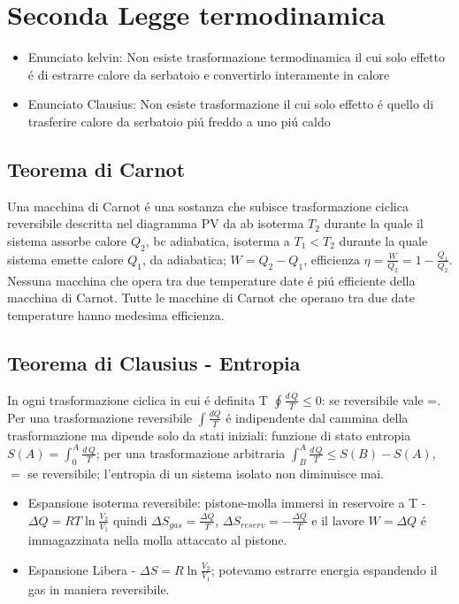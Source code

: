     \chapter{Seconda Legge termodinamica}
        \begin{itemize}
        \item Enunciato kelvin: Non esiste trasformazione termodinamica il cui solo effetto \'e di estrarre calore da serbatoio e convertirlo interamente in calore
        \item Enunciato Clausius: Non esiste trasformazione il cui solo effetto \'e quello di trasferire calore da serbatoio pi\'u freddo a uno pi\'u caldo
        \end{itemize}
        \section{Teorema di Carnot}
        Una macchina di Carnot \'e una sostanza che subisce trasformazione ciclica reversibile descritta nel diagramma PV da ab isoterma $T_2$ durante la quale il sistema assorbe calore $Q_2$, bc adiabatica, isoterma a $T_1<T_2$ durante la quale sistema emette calore $Q_1$, da adiabatica; $W=Q_2-Q_1$, efficienza $\eta=\frac{W}{Q_2}=1-\frac{Q_1}{Q_2}$. Nessuna macchina che opera tra due temperature date \'e pi\'u efficiente della macchina di Carnot. Tutte le macchine di Carnot che operano tra due date temperature hanno medesima efficienza.
        \section{Teorema di Clausius - Entropia}
        In ogni trasformazione ciclica in cui \'e definita T $\oint \frac{d\,Q}{T}\leq0$: se reversibile vale =.
            Per una trasformazione reversibile $\int \frac{dQ}{T}$ \'e indipendente dal cammina della trasformazione ma dipende solo da stati iniziali: funzione di stato entropia $S(A)=\int_0^A \frac{d\,Q}{T}$; per una trasformazione arbitraria $\int_B^A \frac{d\,Q}{T}\leq S(B)-S(A)$, $=$ se reversibile; l'entropia di un sistema isolato non diminuisce mai.
        \begin{itemize}
        \item Espansione isoterma reversibile: pistone-molla immersi in reservoire a T - $\Delta Q=RT\ln{\frac{V_2}{V_1}}$ quindi $\Delta S_{gas}=\frac{\Delta Q}{T}$, $\Delta S_{reserv}=-\frac{\Delta Q}{T}$ e il lavore $W=\Delta Q$ \'e immagazzinata nella molla attaccato al pistone.
        \item Espansione Libera - $\Delta S=R\ln{\frac{V_2}{V_1}}$; potevamo estrarre energia espandendo il gas in maniera reversibile.
        \end{itemize}
